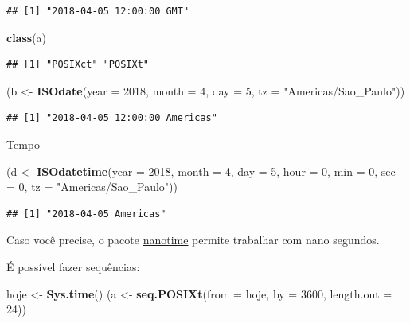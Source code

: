 \documentclass[]{book}
\newenvironment{Shaded}{\begin{snugshade}}{\end{snugshade}}
\newcommand{\KeywordTok}[1]{\textcolor[rgb]{0.13,0.29,0.53}{\textbf{#1}}}
\newcommand{\DataTypeTok}[1]{\textcolor[rgb]{0.13,0.29,0.53}{#1}}
\newcommand{\DecValTok}[1]{\textcolor[rgb]{0.00,0.00,0.81}{#1}}
\newcommand{\StringTok}[1]{\textcolor[rgb]{0.31,0.60,0.02}{#1}}
\newcommand{\NormalTok}[1]{#1}
\theoremstyle{definition}
\theoremstyle{definition}
\theoremstyle{definition}
\theoremstyle{remark}
\begin{document}
\begin{verbatim}
## [1] "2018-04-05 12:00:00 GMT"
\end{verbatim}

\begin{Shaded}
\begin{Highlighting}[]
\KeywordTok{class}\NormalTok{(a)}
\end{Highlighting}
\end{Shaded}

\begin{verbatim}
## [1] "POSIXct" "POSIXt"
\end{verbatim}

\begin{Shaded}
\begin{Highlighting}[]
\NormalTok{(b <-}\StringTok{ }\KeywordTok{ISOdate}\NormalTok{(}\DataTypeTok{year =} \DecValTok{2018}\NormalTok{, }\DataTypeTok{month =} \DecValTok{4}\NormalTok{, }\DataTypeTok{day =} \DecValTok{5}\NormalTok{, }\DataTypeTok{tz =} \StringTok{"Americas/Sao_Paulo"}\NormalTok{))}
\end{Highlighting}
\end{Shaded}

\begin{verbatim}
## [1] "2018-04-05 12:00:00 Americas"
\end{verbatim}

Tempo

\begin{Shaded}
\begin{Highlighting}[]
\NormalTok{(d <-}\StringTok{ }\KeywordTok{ISOdatetime}\NormalTok{(}\DataTypeTok{year =} \DecValTok{2018}\NormalTok{, }\DataTypeTok{month =} \DecValTok{4}\NormalTok{, }\DataTypeTok{day =} \DecValTok{5}\NormalTok{, }\DataTypeTok{hour =} \DecValTok{0}\NormalTok{, }\DataTypeTok{min =} \DecValTok{0}\NormalTok{, }\DataTypeTok{sec =} \DecValTok{0}\NormalTok{,}
                  \DataTypeTok{tz =} \StringTok{"Americas/Sao_Paulo"}\NormalTok{))}
\end{Highlighting}
\end{Shaded}

\begin{verbatim}
## [1] "2018-04-05 Americas"
\end{verbatim}

Caso você precise, o pacote
\href{https://github.com/eddelbuettel/nanotime}{nanotime} permite
trabalhar com nano segundos.

É possível fazer sequências:

\begin{Shaded}
\begin{Highlighting}[]
\NormalTok{hoje <-}\StringTok{ }\KeywordTok{Sys.time}\NormalTok{()}
\NormalTok{(a <-}\StringTok{ }\KeywordTok{seq.POSIXt}\NormalTok{(}\DataTypeTok{from =}\NormalTok{ hoje, }\DataTypeTok{by =} \DecValTok{3600}\NormalTok{, }\DataTypeTok{length.out =} \DecValTok{24}\NormalTok{))}
\end{Highlighting}
\end{Shaded}
\end{document}
